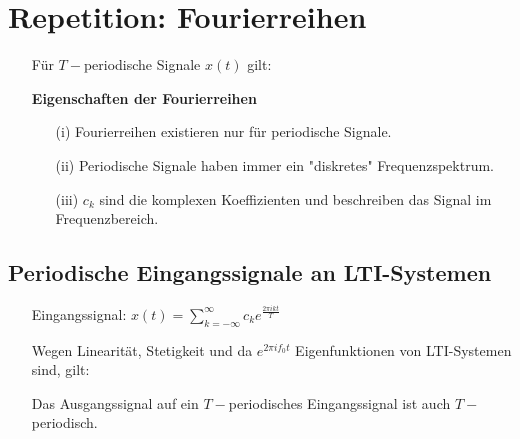\documentclass[11pt]{article}
\begin{document}
\section*{Repetition: Fourierreihen}
\vspace*{-0.5cm}
\begin{itemize}[leftmargin=0pt]
    \item[] Für $T-$periodische Signale $x(t)$ gilt:
    \item[] %
    \item[] \textbf{Eigenschaften der Fourierreihen}\begin{itemize}
        \item[(i)] Fourierreihen existieren nur für periodische Signale.
        \item[(ii)] Periodische Signale haben immer ein "diskretes" Frequenzspektrum.
        \item[(iii)] $c_k$ sind die komplexen Koeffizienten und beschreiben das Signal im Frequenzbereich.
    \end{itemize}
\end{itemize}

\subsection*{Periodische Eingangssignale an LTI-Systemen}
\begin{itemize}[leftmargin=0pt]
    \item[] Eingangssignal: $x(t) = \displaystyle\sum_{k = -\infty}^{\infty} c_k e^{\frac{2 \pi i k t}{T}}$
    \item[] Wegen Linearität, Stetigkeit und da $e^{2 \pi i f_0 t}$ Eigenfunktionen von LTI-Systemen sind, gilt:
    \item[] %
    \item[] Das Ausgangssignal auf ein $T-$periodisches Eingangssignal ist auch $T-$periodisch.
\end{itemize}
\end{document}
